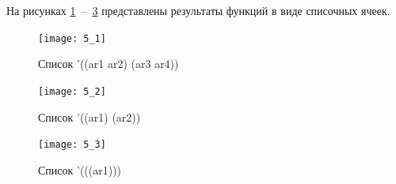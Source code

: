 На рисунках \ref{5_1}~--~\ref{5_3} представлены результаты функций в виде списочных ячеек.

\begin{figure}[H]
	\centering
	\texttt{[image: 5\_1]}
	\caption{Список '((ar1 ar2) (ar3 ar4))}
	\label{5_1}
\end{figure}
\begin{figure}[H]
	\centering
	\texttt{[image: 5\_2]}
	\caption{Список '((ar1) (ar2))}
	\label{5_2}
\end{figure}
\begin{figure}[H]
	\centering
	\texttt{[image: 5\_3]}
	\caption{Список '(((ar1)))}
	\label{5_3}
\end{figure}

\clearpage
